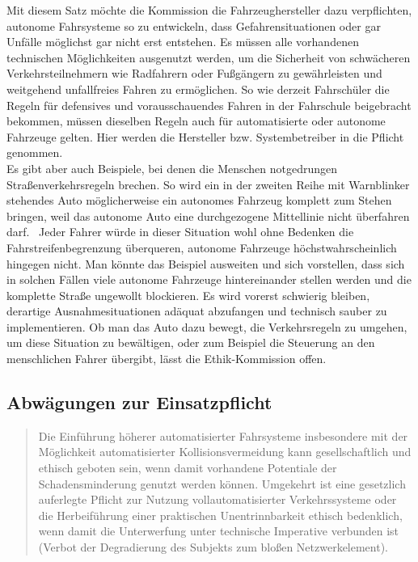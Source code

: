 \documentclass[twoside,a4paper,12pt]{article}
\begin{document}
Mit diesem Satz möchte die Kommission die Fahrzeughersteller dazu verpflichten, autonome Fahrsysteme so zu entwickeln, dass Gefahrensituationen oder gar Unfälle
möglichst gar nicht erst entstehen. Es müssen alle vorhandenen technischen Möglichkeiten ausgenutzt werden, um die Sicherheit von schwächeren Verkehrsteilnehmern wie
Radfahrern oder Fußgängern zu gewährleisten und weitgehend unfallfreies Fahren zu ermöglichen. So wie derzeit Fahrschüler die Regeln für defensives und
vorausschauendes Fahren in der Fahrschule beigebracht bekommen, müssen dieselben Regeln auch für automatisierte oder autonome Fahrzeuge gelten. Hier werden die Hersteller bzw. Systembetreiber in die Pflicht genommen.\\ 

Es gibt aber auch Beispiele, bei denen die Menschen notgedrungen Straßenverkehrsregeln brechen. So wird ein in der zweiten Reihe mit Warnblinker stehendes Auto
möglicherweise ein autonomes Fahrzeug komplett zum Stehen bringen, weil das autonome Auto eine durchgezogene Mittellinie nicht überfahren darf.~\cite{zeit1} Jeder Fahrer würde in dieser Situation wohl ohne Bedenken die Fahrstreifenbegrenzung überqueren, autonome Fahrzeuge höchstwahrscheinlich hingegen nicht. Man könnte das
Beispiel ausweiten und sich vorstellen, dass sich in solchen Fällen viele autonome Fahrzeuge hintereinander stellen werden und die komplette Straße ungewollt blockieren. Es wird vorerst schwierig bleiben, derartige Ausnahmesituationen adäquat abzufangen und technisch sauber zu implementieren. Ob man das Auto dazu bewegt, die
Verkehrsregeln zu umgehen, um diese Situation zu bewältigen, oder zum Beispiel die Steuerung an den menschlichen Fahrer übergibt, lässt die Ethik-Kommission offen.\\ 

\subsection{Abwägungen zur Einsatzpflicht} \label{AbwaegungenZurEinsatzpflicht}

\begin{quote}
\glqq
Die Einführung höherer automatisierter Fahrsysteme insbesondere mit der Möglichkeit
automatisierter Kollisionsvermeidung kann gesellschaftlich und ethisch geboten sein,
wenn damit vorhandene Potentiale der Schadensminderung genutzt werden können.
Umgekehrt ist eine gesetzlich auferlegte Pflicht zur Nutzung vollautomatisierter Verkehrssysteme oder die Herbeiführung 
einer praktischen Unentrinnbarkeit ethisch bedenklich, wenn damit die Unterwerfung unter technische Imperative verbunden 
ist (Verbot der Degradierung des Subjekts zum bloßen Netzwerkelement).\grqq\mbox{~\cite[S. 11]{ek}}
\end{quote}
\end{document}
